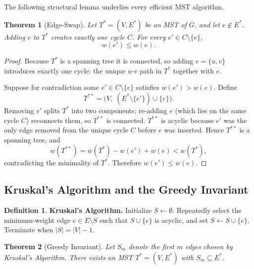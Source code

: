 \documentclass[11pt]{article}
\newtheorem{theorem}{Theorem}
\theoremstyle{definition}
\newtheorem*{definition*}{Definition}
\begin{document}
The following structural lemma underlies every efficient MST algorithm.

\begin{theorem}[Edge-Swap]
Let $T^{*} = (V, E^{*})$ be an MST of $G$, and let $e \notin E^{*}$.
Adding $e$ to $T^{*}$ creates exactly one cycle $C$.
For every $e' \in C \setminus \{e\}$,
\[
  w(e') \leq w(e).
\]
\end{theorem}

\begin{proof}
Because $T^{*}$ is a spanning tree it is connected, so adding $e = \{u, v\}$
introduces exactly one cycle: the unique $u$-$v$ path in $T^{*}$ together with $e$.

Suppose for contradiction some $e' \in C \setminus \{e\}$ satisfies $w(e') > w(e)$.
Define
\[
  T^{**} = \bigl(V,\; (E^{*} \setminus \{e'\}) \cup \{e\}\bigr).
\]
Removing $e'$ splits $T^{*}$ into two components; re-adding $e$ (which lies on the
same cycle $C$) reconnects them, so $T^{**}$ is connected. $T^{**}$ is acyclic
because $e'$ was the only edge removed from the unique cycle $C$ before $e$ was
inserted. Hence $T^{**}$ is a spanning tree, and
\[
  w(T^{**}) = w(T^{*}) - w(e') + w(e) < w(T^{*}),
\]
contradicting the minimality of $T^{*}$. Therefore $w(e') \leq w(e)$.
\end{proof}

\subsection*{Kruskal's Algorithm and the Greedy Invariant}

\begin{definition*}
\textbf{Kruskal's Algorithm.}
Initialize $S \leftarrow \emptyset$. Repeatedly select the minimum-weight edge
$e \in E \setminus S$ such that $S \cup \{e\}$ is acyclic, and set
$S \leftarrow S \cup \{e\}$. Terminate when $|S| = |V| - 1$.
\end{definition*}

\begin{theorem}[Greedy Invariant]
Let $S_m$ denote the first $m$ edges chosen by Kruskal's Algorithm.
There exists an MST $T^{*} = (V, E^{*})$ with $S_m \subseteq E^{*}$.
\end{theorem}
\end{document}
